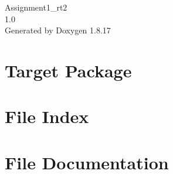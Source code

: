 \let\mypdfximage\pdfximage\def\pdfximage{\immediate\mypdfximage}\documentclass[twoside]{book}
\newcommand{\+}{\discretionary{\mbox{\scriptsize$\hookleftarrow$}}{}{}}
\newcommand{\clearemptydoublepage}{%
  \newpage{\pagestyle{empty}\cleardoublepage}%
}
\begin{document}
\hypersetup{pageanchor=false,
             bookmarksnumbered=true,
             pdfencoding=unicode
            }
\begin{titlepage}
\vspace*{7cm}
\begin{center}%
{\Large Assignment1\+\_\+rt2 \\[1ex]\large 1.\+0 }\\
\vspace*{1cm}
{\large Generated by Doxygen 1.8.17}\\
\end{center}
\end{titlepage}
\clearemptydoublepage
{}
\tableofcontents
\clearemptydoublepage
{}
\hypersetup{pageanchor=true}

\chapter{Target Package}
\label{md__r_e_a_d_m_e}

\chapter{File Index}

\chapter{File Documentation}



\backmatter
\newpage
{}
\clearemptydoublepage
{}
\printindex
\end{document}
